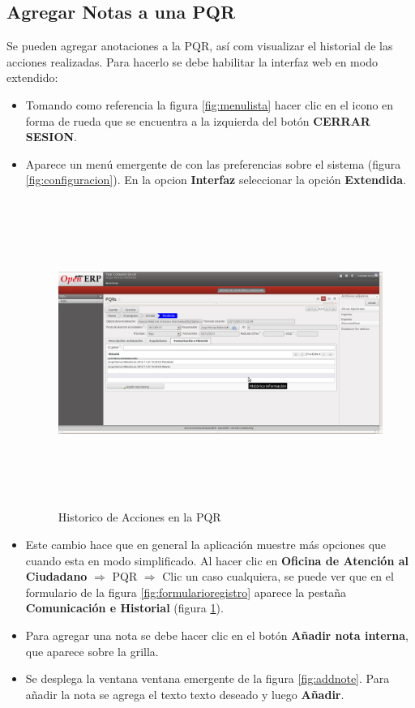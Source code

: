 \subsection{Agregar Notas a una PQR}


Se pueden agregar anotaciones a la PQR, así com visualizar el historial de las acciones realizadas. Para hacerlo se debe habilitar
la interfaz web en modo extendido: 

\begin{itemize}
 \item Tomando como referencia la figura \ref{fig:menulista} hacer clic en el icono en forma de rueda que se encuentra a la
 izquierda del botón \textbf{CERRAR SESION}.
 \item Aparece un menú emergente de con las preferencias sobre el sistema (figura \ref{fig:configuracion}). En la opcion
  \textbf{Interfaz} seleccionar la opción \textbf{Extendida}. 
\begin{figure}[H]
 \centering
 \includegraphics[width=17cm,height=10cm]{./Imagenes/historico.png}
 \caption{Historico de Acciones en la PQR}
 \label{fig:historico}
\end{figure}

 \item Este cambio hace que en general la aplicación muestre más opciones que cuando esta en modo simplificado. Al hacer 
 clic en \textbf{Oficina de Atención al Ciudadano} $\Rightarrow$ PQR $\Rightarrow$ Clic un caso cualquiera, se puede ver
 que en el formulario de la figura \ref{fig:formularioregistro} aparece la pestaña \textbf{Comunicación e Historial} 
 (figura \ref{fig:historico}). 
 \item Para agregar una nota se debe hacer clic en el botón \textbf{Añadir nota interna}, que aparece sobre la grilla.
 \item Se desplega la ventana ventana emergente de la figura \ref{fig:addnote}. Para añadir la nota se agrega el texto
 texto deseado y luego \textbf{Añadir}. 
\end{itemize}

